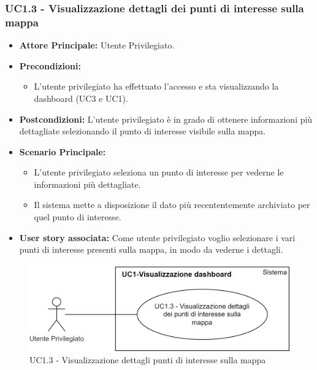 \documentclass[11pt]{article}
\begin{document}
\begin{justify}
\subsubsection{\textbf{UC1.3 - Visualizzazione dettagli dei punti di interesse sulla mappa}}
\begin{itemize}
     \item \textbf{Attore Principale:} Utente Privilegiato.
     \item \textbf{Precondizioni:}
        \begin{itemize}
    		\item L'utente privilegiato ha effettuato l'accesso e sta visualizzando la dashboard (UC3 e UC1).
        \end{itemize}
     \item \textbf{Postcondizioni:} L'utente privilegiato è in grado di ottenere informazioni più dettagliate selezionando il punto di interesse visibile sulla mappa.
     \item \textbf{Scenario Principale:}
        \begin{itemize}
            \item L'utente privilegiato seleziona un punto di interesse per vederne le informazioni più dettagliate.
            \item Il sistema mette a disposizione il dato più recententemente archiviato per quel punto di interesse.
        \end{itemize}
     \item \textbf{User story associata:}
     Come utente privilegiato voglio selezionare i vari punti di interesse presenti sulla mappa, in modo da vederne i dettagli.
\end{itemize}
\begin{figure}[H]
    \centering
    \includegraphics[width=0.5\linewidth]{UC1.3image.png}
    \caption{UC1.3 - Visualizzazione dettagli punti di interesse sulla mappa}
    \label{fig:UC1.3}
\end{figure}

\end{justify}
\end{document}
